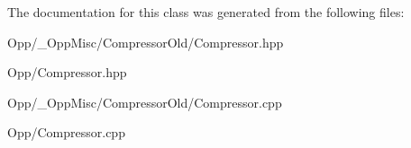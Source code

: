 \-The documentation for this class was generated from the following files\-:\begin{DoxyCompactItemize}
\item 
\-Opp/\-\_\-\-Opp\-Misc/\-Compressor\-Old/\-Compressor.\-hpp\item 
\-Opp/\-Compressor.\-hpp\item 
\-Opp/\-\_\-\-Opp\-Misc/\-Compressor\-Old/\-Compressor.\-cpp\item 
\-Opp/\-Compressor.\-cpp\end{DoxyCompactItemize}
